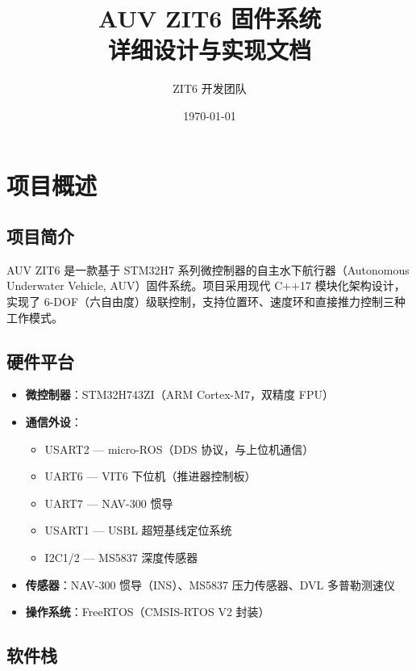\documentclass[12pt,a4paper]{article}
\title{\textbf{AUV ZIT6 固件系统}\\ \Large 详细设计与实现文档}
\author{ZIT6 开发团队}
\date{\today}
\begin{document}
\maketitle
\newpage

\tableofcontents
\newpage

\section{项目概述}

\subsection{项目简介}

AUV ZIT6 是一款基于 STM32H7 系列微控制器的自主水下航行器（Autonomous Underwater Vehicle, AUV）固件系统。项目采用现代 C++17 模块化架构设计，实现了 6-DOF（六自由度）级联控制，支持位置环、速度环和直接推力控制三种工作模式。

\subsection{硬件平台}

\begin{itemize}
    \item \textbf{微控制器}：STM32H743ZI（ARM Cortex-M7，双精度 FPU）
    \item \textbf{通信外设}：
    \begin{itemize}
        \item USART2 — micro-ROS（DDS 协议，与上位机通信）
        \item UART6 — VIT6 下位机（推进器控制板）
        \item UART7 — NAV-300 惯导
        \item USART1 — USBL 超短基线定位系统
        \item I2C1/2 — MS5837 深度传感器
    \end{itemize}
    \item \textbf{传感器}：NAV-300 惯导（INS）、MS5837 压力传感器、DVL 多普勒测速仪
    \item \textbf{操作系统}：FreeRTOS（CMSIS-RTOS V2 封装）
\end{itemize}

\subsection{软件栈}
\end{document}
